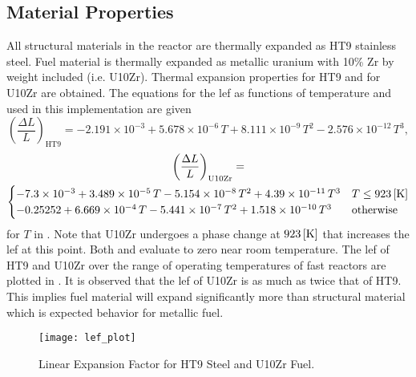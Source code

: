   \subsection{Material Properties}
    \label{sec:model_details__material_properties}
    All structural materials in the reactor are thermally expanded as HT9
    stainless steel. Fuel material is thermally expanded as metallic uranium
    with 10\% Zr by weight included (i.e. U10Zr). Thermal expansion properties
    for HT9 \cite{ht9Prop} and for U10Zr \cite{thexpU10Zr} are obtained. The
    equations for the \gls{lef} as functions of temperature and used in this
    implementation are given
    \begin{equation}
      \label{eq:lef_ht9}
      \left( \frac{\Delta L}{L} \right)_{\text{HT9}} = 
        -2.191 \times 10^{-3} + 5.678 \times 10^{-6} \, T + 
        8.111 \times 10^{-9} \, T^2 - 2.576 \times 10^{-12} \, T^3 ,
    \end{equation}
    \begin{multline}
      \label{eq:lef_u10zr}
      \left( \frac{\Delta L}{L} \right)_{\text{U10Zr}} = \\
        \begin{cases}
          -7.3 \times 10^{-3} + 3.489 \times 10^{-5} \, T 
            - 5.154 \times 10^{-8} \, T^2 + 4.39 \times 10^{-11} \, T^3 & 
            T \le 923 \left[\text{{K}}\right] \\
          -0.25252 + 6.669 \times 10^{-4} \, T - 5.441 \times 10^{-7} \, T^2 
            + 1.518 \times 10^{-10} \, T^3 & \text{otherwise}
        \end{cases}
    \end{multline}
    for $T$ in . Note that U10Zr undergoes a phase change at 
    $923 \left[\text{{K}}\right]$ that increases the \gls{lef} at this point. Both 
     and  evaluate to zero near room
    temperature. The \gls{lef} of HT9 and U10Zr over the range of operating 
    temperatures of fast reactors are plotted in . It is
    observed that the \gls{lef} of U10Zr is as much as twice that of HT9. This 
    implies fuel material will expand significantly more than structural 
    material which is expected behavior for metallic fuel.

    \begin{figure}
      \centering
      \texttt{[image: lef\_plot]}
      \caption{Linear Expansion Factor for HT9 Steel and U10Zr Fuel.}
      \label{fig:lef_plot}
    \end{figure}
    
